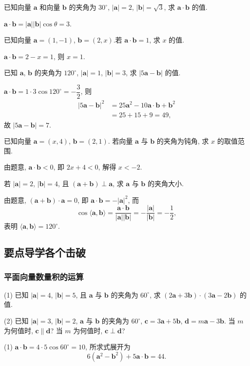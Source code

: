 \lianxi
\begin{exercise}
    已知向量 $\bm{a}$ 和向量 $\bm{b}$ 的夹角为 $30^\circ$, $|\bm{a}|=2$, $|\bm{b}|=\sqrt3$, 求 $\bm{a}\cdot \bm{b}$ 的值.
\end{exercise}
\beginsolution
    $\bm{a}\cdot\bm{b}= |\bm{a}||\bm{b}|\cos\theta= 3$.
\endsolution

\begin{exercise}
    已知向量 $\bm{a}=(1,-1)$, $\bm{b}=(2,x)$.若 $\bm{a}\cdot\bm{b}=1$, 求 $x$ 的值.
\end{exercise}
\beginsolution
    $\bm{a}\cdot\bm{b}= 2-x= 1$, 则 $x=1$.
\endsolution

\begin{exercise}
    已知 $\bm{a}$, $\bm{b}$ 的夹角为 $120^\circ$, $|\bm{a}|=1$, $|\bm{b}|=3$, 求 $|5\bm{a}-\bm{b}|$ 的值.
\end{exercise}
\beginsolution
    $\bm{a}\cdot\bm{b}= 1\cdot 3\cos120^\circ = -\dfrac32$, 则
    \[\begin{aligned}
        |5\bm{a}- \bm{b}|^2
        &= 25\bm{a}^2- 10\bm{a}\cdot\bm{b}+ \bm{b}^2\\
        &= 25+ 15+ 9= 49,
    \end{aligned}\]
    故 $|5\bm{a}-\bm{b}|= 7$.
\endsolution

\begin{exercise}
    已知向量 $\bm{a}=(x,4)$, $\bm{b}=(2,1)$. 若向量 $\bm{a}$ 与 $\bm{b}$ 的夹角为钝角, 求 $x$ 的取值范围.
\end{exercise}
\beginsolution
    由题意, $\bm{a}\cdot\bm{b}<0$, 即 $2x+4<0$, 解得 $x<-2$.
\endsolution

\begin{exercise}
    若 $|\bm{a}|=2$, $|\bm{b}|=4$, 且 $(\bm{a}+\bm{b})\perp\bm{a}$, 
    求 $\bm{a}$ 与 $\bm{b}$ 的夹角大小.
\end{exercise}
\beginsolution
    由题意, $(\bm{a}+\bm{b})\cdot\bm{a}= 0$, 即 $\bm{a}\cdot\bm{b}= -|\bm{a}|^2$, 而
    \[\cos\langle\bm{a},\bm{b}\rangle
        = \frac{\bm{a}\cdot \bm{b}}{|\bm{a}| |\bm{b}|}
        = -\frac{|\bm{a}|}{|\bm{b}|}
        = -\frac12,\]
    表明 $\langle\bm{a},\bm{b}\rangle= 120^\circ$.
\endsolution

\subsection{要点导学\quad 各个击破}
\subsubsection{平面向量数量积的运算}
\begin{example}
    (1) 已知 $|\bm{a}|=4$, $|\bm{b}|=5$, 且 $\bm{a}$ 与 $\bm{b}$ 的夹角为 $60^\circ$, 求 $(2\bm{a}+3\bm{b})\cdot(3\bm{a}-2\bm{b})$ 的值.
    
    (2) 已知 $|\bm{a}|=3$, $|\bm{b}|=2$, $\bm{a}$ 与 $\bm{b}$ 的夹角为 $60^\circ$,
    $\bm{c}=3\bm{a}+5\bm{b}$, $\bm{d}=m\bm{a}-3\bm{b}$.
    当 $m$ 为何值时, $\bm{c}\parallel\bm{d}$?
    当 $m$ 为何值时, $\bm{c}\perp\bm{d}$?
\end{example}
\beginsolution
    (1) $\bm{a}\cdot\bm{b}= 4\cdot 5\cos60^\circ= 10$, 所求式展开为
    \[6(\bm{a}^2- \bm{b}^2)+ 5\bm{a}\cdot\bm{b}= 44.\]

